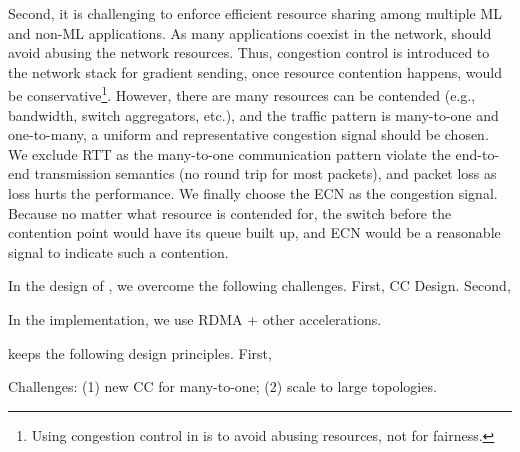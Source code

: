 Second, it is challenging to enforce efficient resource sharing among multiple ML and non-ML applications. As many applications coexist in the network, \sysname should avoid abusing the network resources. Thus, congestion control is introduced to the \sysname network stack for gradient sending, once resource contention happens, \sysname would be conservative\footnote{Using congestion control in \sysname is to avoid abusing resources, not for fairness.}. However, there are many resources can be contended (e.g., bandwidth, switch aggregators, etc.), and the traffic pattern is many-to-one and one-to-many, a uniform and representative congestion signal should be chosen. We exclude RTT as the many-to-one communication pattern violate the end-to-end transmission semantics (no round trip for most packets), and packet loss as loss hurts the performance. We finally choose the ECN as the congestion signal. Because no matter what resource is contended for, the switch before the contention point would have its queue built up, and ECN would be a reasonable signal to indicate such a contention.








In the design of \sysname, we overcome the following challenges. First, CC Design. Second, 

In the implementation, we use RDMA + other accelerations.



\sysname keeps the following design principles. First, 

Challenges: (1) new CC for many-to-one; (2) scale to large topologies.



